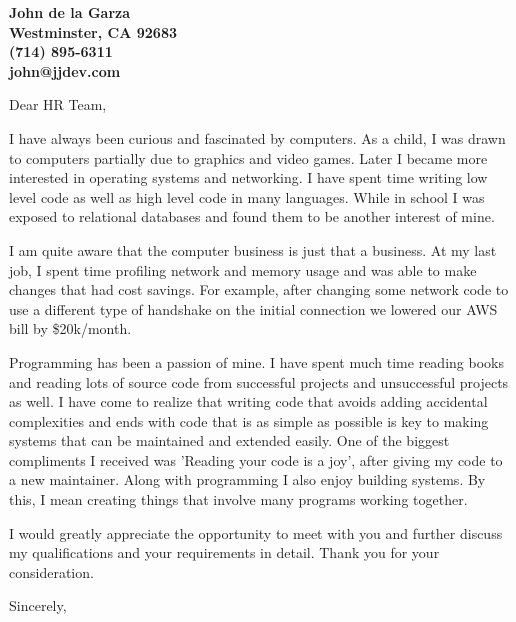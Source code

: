 \documentclass[12pt]{letter} %
\begin{document}
\begin{letter}{}

\begin{center}
	\large\bfseries %
	John de la Garza \\ %
	Westminster, CA 92683 \\
	(714) 895-6311 \\
        john@jjdev.com
\end{center}

\vspace{1cm} %

\signature{John de la Garza} %


\opening{Dear HR Team,}

I have always been curious and fascinated by computers.
As a child, I was drawn to computers partially due to graphics and
video games.  Later I became more interested in operating systems and
networking.  I have spent time writing low level code as
well as high level code in many languages.  While in school I was exposed
to relational databases and found them to be another interest of mine.

I am quite aware that the computer business is just that a business.
At my last job, I spent time profiling network and memory usage and
was able to make changes that had cost savings.  For example, after
changing some network code to use a different type of handshake on
the initial connection we lowered our AWS bill by \$20k/month.

Programming has been a passion of mine.  I have spent much time reading
books and reading lots of source code from successful projects and
unsuccessful projects as well.  I have come to realize that writing code
that avoids adding accidental complexities and ends with code that is
as simple as possible is key to making systems that can be maintained
and extended easily.  One of the biggest compliments I received was
'Reading your code is a joy', after giving my code to a new maintainer.
Along with programming I also enjoy building systems.  By this, I mean
creating things that involve many programs working together.

I would greatly appreciate the opportunity to meet with you and further
discuss my qualifications and your requirements in detail.  Thank you
for your consideration.


\closing{Sincerely,}

\end{letter}
\end{document}

